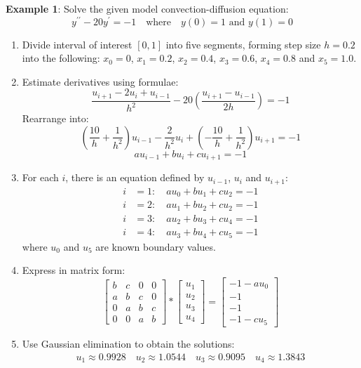 \documentclass[10pt,a4paper]{article}
\begin{document}
\textbf{Example 1}: Solve the given model convection-diffusion equation:
$$
    y^{\prime \prime} - 20y^{\prime}=-1 \quad \text{where} \quad y(0)=1 \text{ and } y(1)=0
$$
\begin{enumerate}
    \item Divide interval of interest $[0,1]$ into five segments, forming step size $h=0.2$ into the
    following: $x_0=0$, $x_1=0.2$, $x_2=0.4$, $x_3=0.6$, $x_4=0.8$ and $x_5=1.0$.

    \item Estimate derivatives using formulae:
    $$
        \frac{u_{i+1}-2u_i+u_{i-1}}{h^2} - 20\left(\frac{u_{i+1}-u_{i-1}}{2h}\right)=-1
    $$
    Rearrange into:
    $$
        \left(\frac{10}{h}+\frac{1}{h^2}\right)u_{i-1} - \frac{2}{h^2}u_i + \left(-\frac{10}{h}+\frac{1}{h^2}\right)u_{i+1} = -1
    $$  
    $$
        au_{i-1} + bu_i + cu_{i+1} = -1
    $$

    \item For each $i$, there is an equation defined by $u_{i-1}$, $u_i$ and $u_{i+1}$:
    \begin{align*}
        i &= 1: \quad au_0+bu_1+cu_2 = -1 \\
        i &= 2: \quad au_1+bu_2+cu_2 = -1 \\
        i &= 3: \quad au_2+bu_3+cu_4 = -1 \\
        i &= 4: \quad au_3+bu_4+cu_5 = -1 
    \end{align*}
    where $u_0$ and $u_5$ are known boundary values.

    \item Express in matrix form:
    $$
    \begin{bmatrix} 
        b&c&0&0 \\
        a&b&c&0 \\
        0&a&b&c \\
        0&0&a&b
    \end{bmatrix} 
    *
    \begin{bmatrix}
        u_1 \\
        u_2 \\
        u_3 \\
        u_4
    \end{bmatrix}
    =
    \begin{bmatrix}
        -1-au_0 \\
        -1 \\
        -1 \\
        -1 - cu_5
    \end{bmatrix}
    $$

    \item Use Gaussian elimination to obtain the solutions:
    \begin{align*}
        u_1 \approx 0.9928 \quad u_2 \approx 1.0544 \quad u_3 \approx 0.9095 \quad u_4 \approx 1.3843
    \end{align*}
\end{enumerate}
\end{document}
